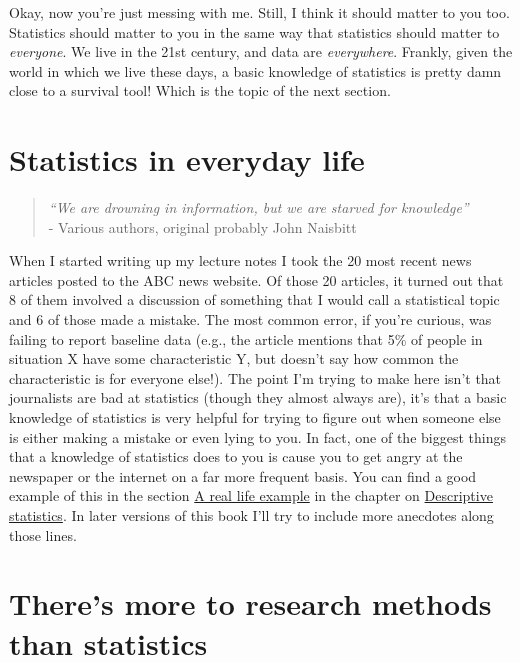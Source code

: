 \documentclass[
]{book}
\begin{document}
Okay, now you're just messing with me. Still, I think it should matter to you too. Statistics should matter to you in the same way that statistics should matter to \emph{everyone}. We live in the 21st century, and data are \emph{everywhere}. Frankly, given the world in which we live these days, a basic knowledge of statistics is pretty damn close to a survival tool! Which is the topic of the next section.

\hypertarget{statistics-in-everyday-life}{%
\section{Statistics in everyday life}\label{statistics-in-everyday-life}}

\begin{quote}
\emph{``We are drowning in information,\emph{\hfill\break
}but we are starved for knowledge''}\\
- Various authors, original probably John Naisbitt
\end{quote}

When I started writing up my lecture notes I took the 20 most recent news articles posted to the ABC news website. Of those 20 articles, it turned out that 8 of them involved a discussion of something that I would call a statistical topic and 6 of those made a mistake. The most common error, if you're curious, was failing to report baseline data (e.g., the article mentions that 5\% of people in situation X have some characteristic Y, but doesn't say how common the characteristic is for everyone else!). The point I'm trying to make here isn't that journalists are bad at statistics (though they almost always are), it's that a basic knowledge of statistics is very helpful for trying to figure out when someone else is either making a mistake or even lying to you. In fact, one of the biggest things that a knowledge of statistics does to you is cause you to get angry at the newspaper or the internet on a far more frequent basis. You can find a good example of this in the section \protect\hyperlink{a-real-life-example}{A real life example} in the chapter on \protect\hyperlink{descriptive-statistics}{Descriptive statistics}. In later versions of this book I'll try to include more anecdotes along those lines.

\hypertarget{theres-more-to-research-methods-than-statistics}{%
\section{There's more to research methods than statistics}\label{theres-more-to-research-methods-than-statistics}}
\end{document}
